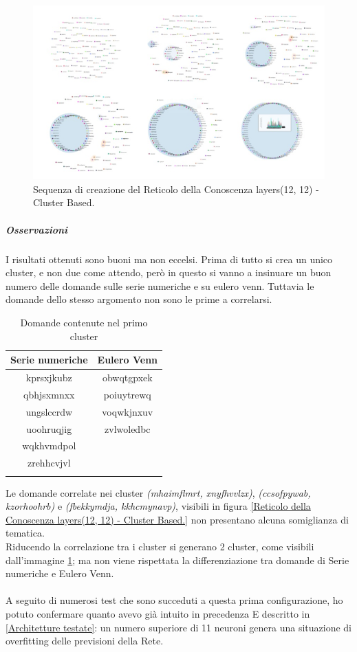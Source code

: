 \begin{figure}[H]
\centering
	\includegraphics[width=0.70\linewidth]{./image/collage_reticolo-logica(12,12).png}
	\caption{Sequenza di creazione del Reticolo della Conoscenza layers(12, 12) - Cluster Based.}
	\label{Sequenza di creazione del Reticolo della Conoscenza layers(12, 12) - Cluster Based.}
\end{figure}
\noindent

\subparagraph{Osservazioni}\mbox{}
\noindent
I risultati ottenuti sono buoni ma non eccelsi. Prima di tutto si crea un unico cluster, e non due come attendo, però in questo si vanno a insinuare un buon numero delle domande sulle serie numeriche e su eulero venn. Tuttavia le domande dello stesso argomento non sono le prime a correlarsi.
\begin{longtable}{|c|c|}
	\hline
	\textbf{Serie numeriche} & \textbf{Eulero Venn} \\\hline\hline
	kprsxjkubz & obwqtgpxek \\
	qbhjsxmnxx & poiuytrewq \\
	ungslccrdw & voqwkjnxuv \\ 
	uoohruqjig & zvlwoledbc \\
	wqkhvmdpol & \\
	zrehhcvjvl & \\
\hline
\caption{Domande contenute nel primo cluster}\label{tab:Domande contenute nel primo cluster}
\end{longtable}
\noindent
Le domande correlate nei cluster \textit{(mhaimflmrt, xnyfhvvlzx)}, \textit{(ccsofpywab, kzorhoohrb)} e \textit{(fbekkymdja, kkhcmynavp)}, visibili in figura \ref{Reticolo della Conoscenza layers(12, 12) - Cluster Based.}  non presentano alcuna somiglianza di tematica. \\
Riducendo la correlazione tra i cluster si generano 2 cluster, come visibili dall'immagine \ref{Sequenza di creazione del Reticolo della Conoscenza layers(12, 12) - Cluster Based.}; ma non viene rispettata la differenziazione tra domande di Serie numeriche e Eulero Venn.\\\\
A seguito di numerosi test che sono succeduti a questa prima configurazione, ho potuto confermare quanto avevo gi\`a intuito in precedenza E descritto in \ref{Architetture testate}: un numero superiore di 11 neuroni genera una situazione di overfitting delle previsioni della Rete.

